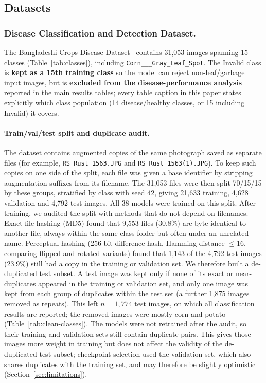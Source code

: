 \subsection{Datasets}

\subsubsection{Disease Classification and Detection Dataset.}
The Bangladeshi Crops Disease Dataset~\cite{bangladesh_dataset}
contains 31,053 images spanning 15 classes
(Table~\ref{tab:classes}), including \texttt{Corn\_\_\_Gray\_Leaf\_Spot}.
The Invalid class is \textbf{kept as a 15th training class}
so the model can reject non-leaf/garbage input images, but is
\textbf{excluded from the disease-performance analysis} reported in
the main results tables; every table caption in this paper states
explicitly which class population (14 disease/healthy classes, or 15
including Invalid) it covers.
\paragraph{Train/val/test split and duplicate audit.}\label{sec:split} The dataset contains augmented copies of the same photograph saved as separate files (for example, \texttt{RS\_Rust 1563.JPG} and \texttt{RS\_Rust 1563(1).JPG}). To keep such copies on one side of the split, each file was given a base identifier by stripping augmentation suffixes from its filename. The 31,053 files were then split 70/15/15 by these groups, stratified by class with seed 42, giving 21,633 training, 4,628 validation and 4,792 test images. All 38 models were trained on this split. After training, we audited the split with methods that do not depend on filenames. Exact-file hashing (MD5) found that 9,553 files (30.8\%) are byte-identical to another file, always within the same class folder but often under an unrelated name. Perceptual hashing (256-bit difference hash, Hamming distance $\le 16$, comparing flipped and rotated variants) found that 1,143 of the 4,792 test images (23.9\%) still had a copy in the training or validation set. We therefore built a de-duplicated test subset. A test image was kept only if none of its exact or near-duplicates appeared in the training or validation set, and only one image was kept from each group of duplicates within the test set (a further 1,875 images removed as repeats). This left $n=1{,}774$ test images, on which all classification results are reported; the removed images were mostly corn and potato (Table~\ref{tab:clean-classes}). The models were not retrained after the audit, so their training and validation sets still contain duplicate pairs. This gives those images more weight in training but does not affect the validity of the de-duplicated test subset; checkpoint selection used the validation set, which also shares duplicates with the training set, and may therefore be slightly optimistic (Section~\ref{sec:limitations}).


